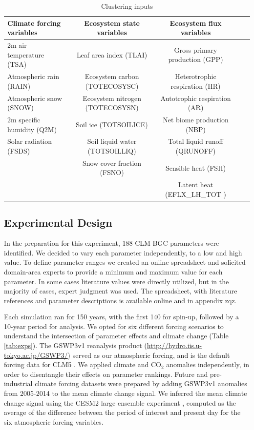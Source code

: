 \documentclass[draft]{agujournal2019}
\begin{document}
\begin{table}[h]
\caption{Clustering inputs}
\centering
\begin{tabular}{l c c c c}
 \hline
 Climate forcing variables & Ecosystem state variables &Ecosystem flux variables \\
 \hline
 2m air temperature (TSA) & Leaf area index (TLAI) & Gross primary production (GPP) \\
Atmospheric rain (RAIN) & Ecosystem carbon (TOTECOSYSC) &Heterotrophic respiration (HR) \\
Atmospheric snow (SNOW) &  Ecosystem nitrogen (TOTECOSYSN) &Autotrophic respiration (AR) \\
2m specific humidity (Q2M) & Soil ice (TOTSOILICE) &Net biome production (NBP) \\
Solar radiation (FSDS) & Soil liquid water (TOTSOILLIQ) & Total liquid runoff (QRUNOFF) \\
& Snow cover fraction (FSNO) & Sensible heat  (FSH) \\
&&Latent heat (EFLX\_LH\_TOT ) \\
 \hline
 \end{tabular}
 \label{tab:sg}
 \end{table}


\subsection{Experimental Design}
In the preparation for this experiment, 188 CLM-BGC parameters were identified. We decided to vary each parameter independently, to a low and high value. To define parameter ranges we created an online spreadsheet and solicited domain-area experts to provide a minimum and maximum value for each parameter. In some cases literature values were directly utilized, but in the majority of cases, expert judgment was used. The spreadsheet, with literature references and parameter descriptions is available online and in appendix zqz.

Each simulation ran for 150 years, with the first 140 for spin-up, followed by a 10-year period for analysis. We opted for six different forcing scenarios to understand the intersection of parameter effects and climate change (Table \ref{tab:exps}). The GSWP3v1 reanalysis product (\url{http://hydro.iis.u-tokyo.ac.jp/GSWP3/}) served as our atmospheric forcing, and is the default forcing data for CLM5 \cite{lawrence2019}. We applied climate and CO$_2$ anomalies independently, in order to disentangle their effects on parameter rankings. Future and pre-industrial climate forcing datasets were prepared by adding GSWP3v1 anomalies from 2005-2014 to the mean climate change signal. We inferred the mean climate change signal using the CESM2 large ensemble experiment \cite{rodgers2021}, computed as the average of the difference between the period of interest and present day for the six atmospheric forcing variables.
\end{document}
